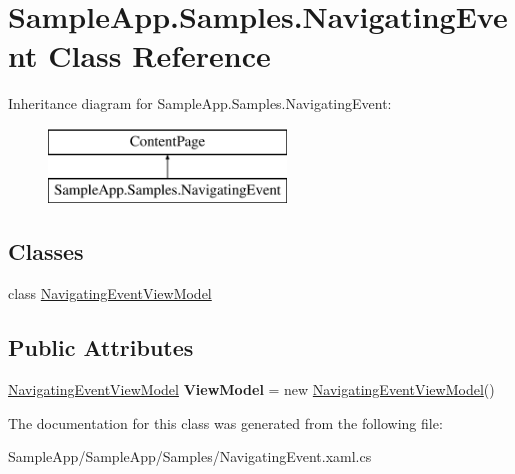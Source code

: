 \hypertarget{class_sample_app_1_1_samples_1_1_navigating_event}{}\section{Sample\+App.\+Samples.\+Navigating\+Event Class Reference}
\label{class_sample_app_1_1_samples_1_1_navigating_event}
Inheritance diagram for Sample\+App.\+Samples.\+Navigating\+Event\+:\begin{figure}[H]
\begin{center}
\leavevmode
\includegraphics[height=2.000000cm]{class_sample_app_1_1_samples_1_1_navigating_event}
\end{center}
\end{figure}
\subsection*{Classes}
\begin{DoxyCompactItemize}
\item 
class \hyperlink{class_sample_app_1_1_samples_1_1_navigating_event_1_1_navigating_event_view_model}{Navigating\+Event\+View\+Model}
\end{DoxyCompactItemize}
\subsection*{Public Attributes}
\begin{DoxyCompactItemize}
\item 
\mbox{\label{class_sample_app_1_1_samples_1_1_navigating_event_a7029ae9e8e4a10157b04a80832a2f0ee}} 
\hyperlink{class_sample_app_1_1_samples_1_1_navigating_event_1_1_navigating_event_view_model}{Navigating\+Event\+View\+Model} {\bfseries View\+Model} = new \hyperlink{class_sample_app_1_1_samples_1_1_navigating_event_1_1_navigating_event_view_model}{Navigating\+Event\+View\+Model}()
\end{DoxyCompactItemize}


The documentation for this class was generated from the following file\+:\begin{DoxyCompactItemize}
\item 
Sample\+App/\+Sample\+App/\+Samples/Navigating\+Event.\+xaml.\+cs\end{DoxyCompactItemize}
